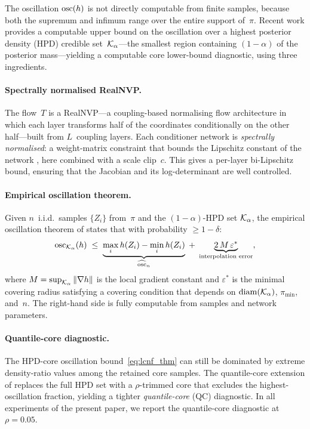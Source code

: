 The oscillation $\mathrm{osc}(h)$ is not directly computable from
finite samples, because both the supremum and infimum range
over the entire support of~$\pi$.  Recent work
\citep{LCNF} provides a computable upper bound on the
oscillation over a highest posterior density (HPD) credible
set~$\mathcal{K}_\alpha$---the smallest region containing
$(1{-}\alpha)$ of the posterior mass---yielding a
computable core lower-bound diagnostic, using three ingredients.

\paragraph{Spectrally normalised RealNVP.}
The flow~$T$ is a RealNVP---a coupling-based normalising flow
architecture \citep{DinhSohlDickstein2017} in which each layer transforms
half of the coordinates conditionally on the other half---built
from $L$~coupling layers.  Each conditioner network is
\emph{spectrally normalised}: a weight-matrix constraint that
bounds the Lipschitz constant of the network
\citep{Miyato2018}, here combined with a scale clip~$c$.
This gives a per-layer bi-Lipschitz bound, ensuring that the
Jacobian and its log-determinant are well controlled.

\paragraph{Empirical oscillation theorem.}
Given $n$~i.i.d.\ samples $\{Z_i\}$ from~$\pi$ and the
$(1{-}\alpha)$-HPD set $\mathcal{K}_\alpha$, the empirical oscillation
theorem of \citet{LCNF} states
that with probability $\geq 1 - \delta$:
\begin{equation}\label{eq:lcnf_thm}
  \mathrm{osc}_{\mathcal{K}_\alpha}(h)
  \;\leq\;
  \underbrace{\max_i h(Z_i) - \min_i h(Z_i)}_{\widehat{\mathrm{osc}}_n}
  \;+\;
  \underbrace{2\,M\,\varepsilon^*}_{\text{interpolation error}},
\end{equation}
where $M = \sup_{\mathcal{K}_\alpha}\|\nabla h\|$ is the local gradient
constant and $\varepsilon^*$ is the minimal covering radius
satisfying a covering condition that depends on
$\mathrm{diam}(\mathcal{K}_\alpha)$, $\pi_{\min}$, and~$n$.
The right-hand side is fully computable from samples and
network parameters.

\paragraph{Quantile-core diagnostic.}
The HPD-core oscillation bound~\eqref{eq:lcnf_thm}
can still be dominated by extreme density-ratio values
among the retained core samples.  The quantile-core extension
of \citet{CerTMCMC} replaces the full HPD set with a
$\rho$-trimmed core that excludes the highest-oscillation
fraction, yielding a tighter \emph{quantile-core} (QC) diagnostic.
In all experiments of the present paper, we report the
quantile-core diagnostic at $\rho = 0.05$.

